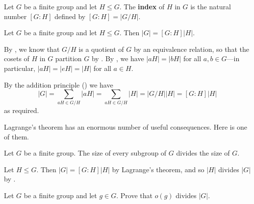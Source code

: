 \todo{}

\begin{definition}
\label{defIndexOfSubgroup}
Let $G$ be a finite group and let $H \le G$. The \textbf{index} of $H$ in $G$ is the natural number $[G:H]$ defined by $[G:H] = |G/H|$.
\end{definition}

\todo{}

\begin{theorem}
\label{thmLagrange}
Let $G$ be a finite group and let $H \le G$. Then $|G| = [G : H] |H|$.
\end{theorem}

\begin{cproof}
By , we know that $G/H$ is a quotient of $G$ by an equivalence relation, so that the cosets of $H$ in $G$ partition $G$ by . By , we have $|aH| = |bH|$ for all $a,b \in G$---in particular, $|aH| = |eH| = |H|$ for all $a \in H$.

By the addition principle () we have
\[ |G| = \sum_{aH \in G/H} |aH| = \sum_{aH \in G/H} |H| = |G/H| |H| = [G:H] |H| \]
as required.
\end{cproof}

Lagrange's theorem has an enormous number of useful consequences. Here is one of them.

\begin{corollary}
\label{corSizeOfSubgroupDividesSizeOfGroup}
Let $G$ be a finite group. The size of every subgroup of $G$ divides the size of $G$.
\end{corollary}

\begin{cproof}
Let $H \le G$. Then $|G| = [G:H] |H|$ by Lagrange's theorem, and so $|H|$ divides $|G|$ by .
\end{cproof}

\todo{}

\begin{exercise}
Let $G$ be a finite group and let $g \in G$. Prove that $o(g)$ divides $|G|$.
\end{exercise}

\todo{}